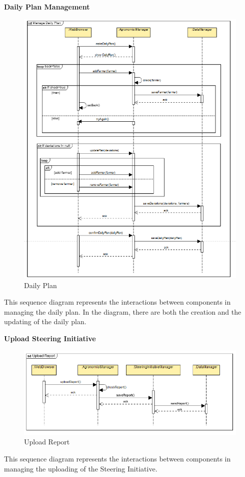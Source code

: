 \documentclass[table, 12pt]{article}
\begin{document}
\newpage
\textbf{Daily Plan Management}
\begin{center}
    \begin{figure}[H]
        
        \includegraphics[scale=0.70, center]{assets/SequenceDiagram/ManageDailyPlan.png}
        \caption{Daily Plan}
        \label{fig: dailyPlan}
    \end{figure}
\end{center}
This sequence diagram represents the interactions between components in managing the daily plan.
In the diagram, there are both the creation and the updating of the daily plan.

\newpage
\textbf{Upload Steering Initiative}
\begin{center}
    \begin{figure}[H]
        \includegraphics[scale=0.7, center] {assets/SequenceDiagram/uploadReport.png}
        \caption{Upload Report}
        \label{fig: uploadReport}
    \end{figure}
\end{center}
This sequence diagram represents the interactions between components in managing the uploading of the Steering Initiative.
\end{document}
